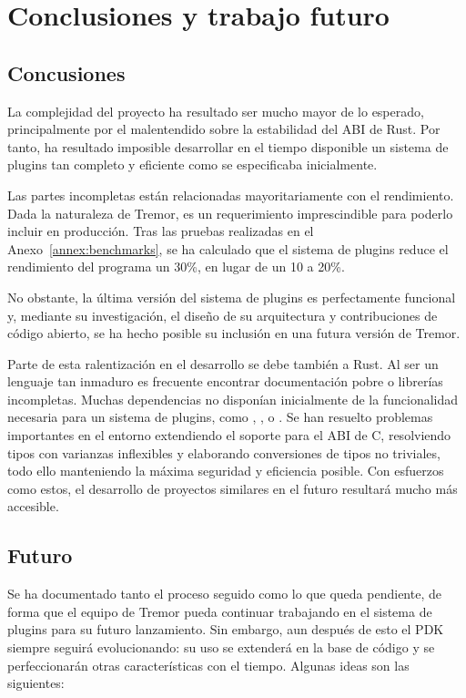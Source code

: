 
\chapter{Conclusiones y trabajo futuro}

\section{Concusiones}

La complejidad del proyecto ha resultado ser mucho mayor de lo esperado,
principalmente por el malentendido sobre la estabilidad del ABI de Rust. Por
tanto, ha resultado imposible desarrollar en el tiempo disponible un sistema de
plugins tan completo y eficiente como se especificaba inicialmente.

Las partes incompletas están relacionadas mayoritariamente con el rendimiento.
Dada la naturaleza de Tremor, es un requerimiento imprescindible para poderlo
incluir en producción. Tras las pruebas realizadas en el
Anexo~\ref{annex:benchmarks}, se ha calculado que el sistema de plugins reduce
el rendimiento del programa un 30\%, en lugar de un 10 a 20\%.

No obstante, la última versión del sistema de plugins es perfectamente funcional
y, mediante su investigación, el diseño de su arquitectura y contribuciones de
código abierto, se ha hecho posible su inclusión en una futura versión de
Tremor.

Parte de esta ralentización en el desarrollo se debe también a Rust. Al ser un
lenguaje tan inmaduro es frecuente encontrar documentación pobre o librerías
incompletas. Muchas dependencias no disponían inicialmente de la funcionalidad
necesaria para un sistema de plugins, como , ,
 o . Se han resuelto problemas importantes en el
entorno extendiendo el soporte para el ABI de C, resolviendo tipos con varianzas
inflexibles y elaborando conversiones de tipos no triviales, todo ello
manteniendo la máxima seguridad y eficiencia posible. Con esfuerzos como estos,
el desarrollo de proyectos similares en el futuro resultará mucho más accesible.

\section{Futuro}

Se ha documentado tanto el proceso seguido como lo que queda pendiente, de forma
que el equipo de Tremor pueda continuar trabajando en el sistema de plugins para
su futuro lanzamiento. Sin embargo, aun después de esto el PDK siempre seguirá
evolucionando: su uso se extenderá en la base de código y se perfeccionarán
otras características con el tiempo. Algunas ideas son las siguientes:

